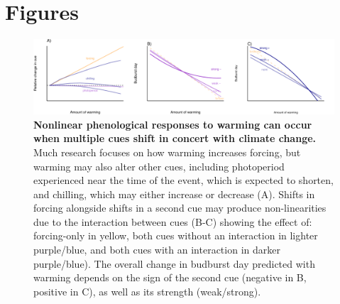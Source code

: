 \documentclass[11pt,letter]{article}
\begin{document}
\section{Figures}
\clearpage
\begin{figure}
\centering
\includegraphics[width=1\textwidth]{..//..//analyses/limitingcues/figures/intxnsims2021photoaltwithchill_3panels.pdf} %
\caption{{\bf Nonlinear phenological responses to warming can occur when multiple cues shift in concert with climate change.} Much research focuses on how warming increases forcing, but warming may also alter other cues, including photoperiod experienced near the time of the event, which is expected to shorten, and chilling, which may either increase or decrease (A). Shifts in forcing alongside shifts in a second cue may produce non-linearities due to the interaction between cues (B-C) showing the effect of: forcing-only in yellow, both cues without an interaction in lighter purple/blue, and both cues with an interaction in darker purple/blue). The overall change in budburst day predicted with warming depends on the sign of the second cue (negative in B, positive in C), as well as its strength (weak/strong).}
  \label{fig:intxncues}
\end{figure}
\end{document}

